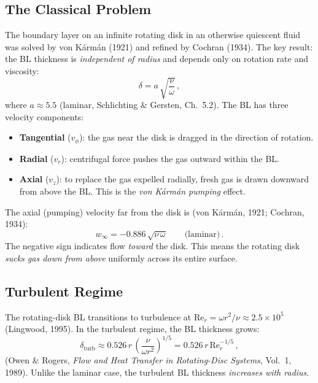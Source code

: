 \documentclass[11pt,a4paper]{article}
\begin{document}
\subsection{The Classical Problem}

The boundary layer on an infinite rotating disk in an otherwise
quiescent fluid was solved by von K\'arm\'an (1921) and refined by
Cochran (1934). The key result: the BL thickness is
\emph{independent of radius} and depends only on rotation rate and
viscosity:
\begin{equation}
  \delta = a\,\sqrt{\frac{\nu}{\omega}}\,,
  \label{eq:delta_vK}
\end{equation}
where $a \approx 5.5$ (laminar, Schlichting \& Gersten, Ch.~5.2).
The BL has three velocity components:
\begin{itemize}
  \item \textbf{Tangential} ($v_\phi$): the gas near the disk is
        dragged in the direction of rotation.
  \item \textbf{Radial} ($v_r$): centrifugal force pushes the gas
        outward within the BL.
  \item \textbf{Axial} ($v_z$): to replace the gas expelled radially,
        fresh gas is drawn downward from above the BL. This is the
        \emph{von K\'arm\'an pumping} effect.
\end{itemize}

The axial (pumping) velocity far from the disk is
(von K\'arm\'an, 1921; Cochran, 1934):
\begin{equation}
  w_\infty = -0.886\,\sqrt{\nu\,\omega}
  \qquad\text{(laminar)}\,.
  \label{eq:w_inf_lam}
\end{equation}
The negative sign indicates flow \emph{toward} the disk. This means
the rotating disk \emph{sucks gas down from above} uniformly across
its entire surface.

\subsection{Turbulent Regime}

The rotating-disk BL transitions to turbulence at
$\mathrm{Re}_r = \omega r^2 / \nu \approx 2.5 \times 10^5$
(Lingwood, 1995). In the turbulent regime, the BL thickness grows:
\begin{equation}
  \delta_\mathrm{turb} \approx 0.526\,r\,
    \left(\frac{\nu}{\omega r^2}\right)^{1/5}
  = 0.526\,r\,\mathrm{Re}_r^{-1/5}\,,
  \label{eq:delta_turb}
\end{equation}
(Owen \& Rogers, \emph{Flow and Heat Transfer in Rotating-Disc Systems},
Vol.~1, 1989). Unlike the laminar case, the turbulent BL thickness
\emph{increases with radius}.
\end{document}
